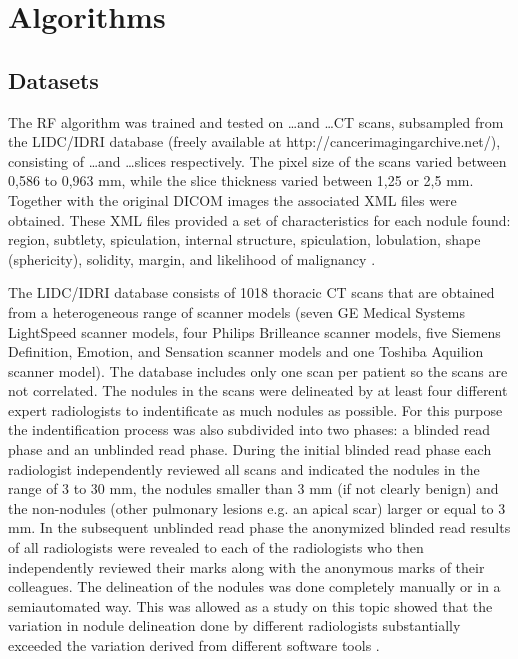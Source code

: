 \section{Algorithms}

\subsection{Datasets}
The RF algorithm was trained and tested on \ldots and \ldots CT scans,
subsampled from the LIDC/IDRI database (freely available at
http://cancerimagingarchive.net/), consisting of \ldots and \ldots slices
respectively. The pixel size of the scans varied between 0,586 to 0,963 mm,
while the slice thickness varied between 1,25 or 2,5 mm. Together with the
original DICOM images the associated XML files were obtained. These XML files
provided a set of characteristics for each nodule found: region, subtlety,
spiculation, internal structure, spiculation, lobulation, shape (sphericity),
solidity, margin, and likelihood of malignancy \cite{lidcbase}.

The LIDC/IDRI database consists of 1018 thoracic CT scans that are obtained from
a heterogeneous range of scanner models (seven GE Medical Systems LightSpeed
scanner models, four Philips Brilleance scanner models, five Siemens Definition,
Emotion, and Sensation scanner models and one Toshiba Aquilion scanner model).
The database includes only one scan per patient so the scans are not correlated.
The nodules in the scans were delineated by at least four different expert
radiologists to indentificate as much nodules as possible. For this purpose the
indentification process was also subdivided into two phases: a blinded read
phase and an unblinded read phase. During the initial blinded read phase each
radiologist independently reviewed all scans and indicated the nodules in the
range of 3 to 30 mm, the nodules smaller than 3 mm (if not clearly benign) and
the non-nodules (other pulmonary lesions e.g. an apical scar) larger or equal to
3 mm. In the subsequent unblinded read phase the anonymized blinded read results
of all radiologists were revealed to each of the radiologists who then
independently reviewed their marks along with the anonymous marks of their
colleagues. The delineation of the nodules was done completely manually or in a
semiautomated way. This was allowed as a study on this topic showed that the
variation in nodule delineation done by different radiologists
substantially exceeded the variation derived from different software tools
\cite{lidcbase}.






